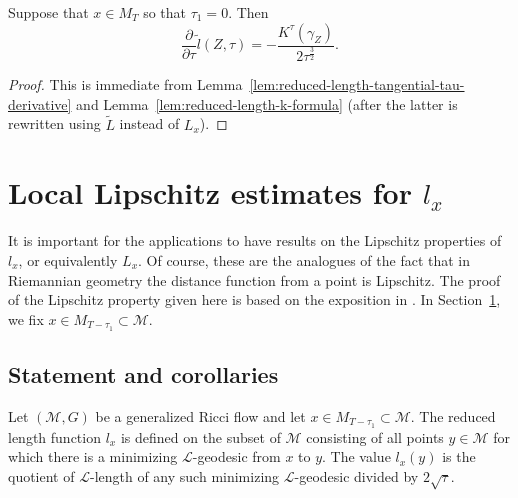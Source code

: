 \begin{corollary}\label{cor:reduced-length-tangential-k-derivative}
\label{tildelK}

Suppose that $x\in M_T$ so that
$\tau_1=0$. Then
$$\frac{\partial}{\partial\tau}\widetilde
l(Z,\tau)=-\frac{K^\tau(\gamma_Z)}{2\tau^{\frac{3}{2}}}.$$
\end{corollary}

\begin{proof}
\sketch
{}
This is immediate from Lemma~\ref{lem:reduced-length-tangential-tau-derivative} and Lemma~\ref{lem:reduced-length-k-formula} (after the
latter is rewritten using $\widetilde L$ instead of $L_x$).
\end{proof}



\section{Local Lipschitz estimates for $l_x$}\label{sect:lips}

It is important for the applications to have results on the
Lipschitz properties of $l_x$, or equivalently $L_x$. Of course,
these are the analogues of the fact that in Riemannian geometry the
distance function from a point is Lipschitz. The proof of the
Lipschitz property given here is based on the exposition in
\cite{Ye}. In Section~\ref{sect:lips}, we fix $x\in
M_{T-\tau_1}\subset {\mathcal M}$.

\subsection{Statement and corollaries}


\begin{definition}\label{def:reduced-length-domain}

Let $({\mathcal M},G)$ be a generalized Ricci flow and let $x\in
M_{T-\tau_1}\subset {\mathcal M}$. The reduced length function $l_x$ is defined
on the subset of ${\mathcal M}$ consisting of all points $y\in {\mathcal M}$
for which there is a minimizing ${\mathcal L}$-geodesic from $x$ to $y$. The
value $l_x(y)$ is the quotient of ${\mathcal L}$-length of any such minimizing
${\mathcal L}$-geodesic divided by $2\sqrt{\tau}$.
\end{definition}

